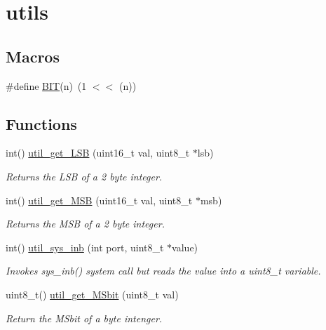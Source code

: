 \hypertarget{group__utils}{}\section{utils}
\label{group__utils}
\subsection*{Macros}
\begin{DoxyCompactItemize}
\item 
\#define \hyperlink{group__utils_ga3a8ea58898cb58fc96013383d39f482c}{B\+IT}(n)~(1 $<$$<$ (n))
\end{DoxyCompactItemize}
\subsection*{Functions}
\begin{DoxyCompactItemize}
\item 
int() \hyperlink{group__utils_ga81621440b3d65680979425e39aa8c789}{util\+\_\+get\+\_\+\+L\+SB} (uint16\+\_\+t val, uint8\+\_\+t $\ast$lsb)
\begin{DoxyCompactList}\small\item\em Returns the L\+SB of a 2 byte integer. \end{DoxyCompactList}\item 
int() \hyperlink{group__utils_ga6a880076cd2ec468834438b6e0c58836}{util\+\_\+get\+\_\+\+M\+SB} (uint16\+\_\+t val, uint8\+\_\+t $\ast$msb)
\begin{DoxyCompactList}\small\item\em Returns the M\+SB of a 2 byte integer. \end{DoxyCompactList}\item 
int() \hyperlink{group__utils_ga79a031a8611f5b2d6afa4158e92b0fb4}{util\+\_\+sys\+\_\+inb} (int port, uint8\+\_\+t $\ast$value)
\begin{DoxyCompactList}\small\item\em Invokes sys\+\_\+inb() system call but reads the value into a uint8\+\_\+t variable. \end{DoxyCompactList}\item 
uint8\+\_\+t() \hyperlink{group__utils_gaca4b22ad3b1f07c438b1a6fc3ac1052c}{util\+\_\+get\+\_\+\+M\+Sbit} (uint8\+\_\+t val)
\begin{DoxyCompactList}\small\item\em Return the M\+Sbit of a byte intenger. \end{DoxyCompactList}\end{DoxyCompactItemize}


